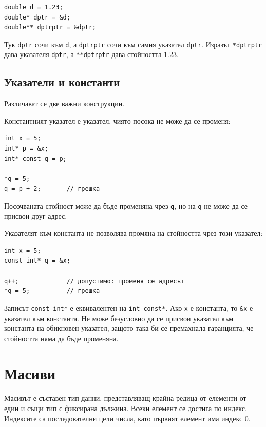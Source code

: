 \begin{verbatim}
double d = 1.23;
double* dptr = &d;
double** dptrptr = &dptr;
\end{verbatim}

Тук \texttt{dptr} сочи към \texttt{d}, а \texttt{dptrptr} сочи към самия указател \texttt{dptr}. Изразът \texttt{*dptrptr} дава указателя \texttt{dptr}, а \texttt{**dptrptr} дава стойността $1.23$.

\subsection{Указатели и константи}\label{s:15.1.3}

Различават се две важни конструкции.

Константният указател е указател, чиято посока не може да се променя:

\begin{verbatim}
int x = 5;
int* p = &x;
int* const q = p;

*q = 5;
q = p + 2;       // грешка
\end{verbatim}

Посочваната стойност може да бъде променяна чрез \texttt{q}, но на \texttt{q} не може да се присвои друг адрес.

Указателят към константа не позволява промяна на стойността чрез този указател:

\begin{verbatim}
int x = 5;
const int* q = &x;

q++;             // допустимо: променя се адресът
*q = 5;          // грешка
\end{verbatim}

Записът \texttt{const int*} е еквивалентен на \texttt{int const*}. Ако \texttt{x} е константа, то \texttt{\&x} е указател към константа. Не може безусловно да се присвои указател към константа на обикновен указател, защото така би се премахнала гаранцията, че стойността няма да бъде променяна.

\section{Масиви}\label{s:15.2}

\begin{defn}
Масивът е съставен тип данни, представляващ крайна редица от елементи от един и същи тип с фиксирана дължина. Всеки елемент се достига по индекс. Индексите са последователни цели числа, като първият елемент има индекс $0$.
\end{defn}

